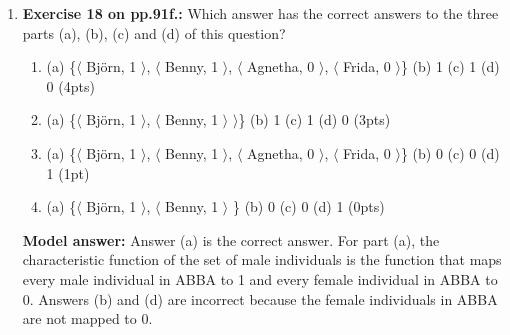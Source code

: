 \documentclass[a4,11pt]{article}
\begin{document}
\begin{enumerate}[leftmargin = 12pt]
\begin{enumerate}[noitemsep]
          \item (a) Agnetha (b) false (c) true (2pts)
        
         \item (a) Agnetha (b) true (c) true (1pt)
         
          \item (a) Agnetha (b) false (c) false (1pt)
         
\end{enumerate}

{\bf Model answer:} Answer (a) is the correct answer. For part (a), the `partner' function maps Agnetha to Bj\"orn, as represented by the pair $\langle$ Agnetha, Bj\"orn $\rangle$. 

For part (b), the `partner' function maps Bj\"orn to Agnetha, not to Frida, so the statement is false. 

For part (c), the `partner' function maps Bj\"orn to Agnetha, so $f(f($Bj\"orn$))$ is $f($Agnetha$)$, which is identical to the expression to the right of the equal sign.

\item {\bf Exercise 18 on pp.91f.:} Which answer has the correct answers to the three parts (a), (b), (c) and (d) of this question? 

\begin{enumerate}[noitemsep]
        \item (a) \{$\langle$ Bj\"orn, 1 $\rangle$, $\langle$ Benny, 1 $\rangle$, $\langle$ Agnetha, 0 $\rangle$, $\langle$ Frida, 0 $\rangle$\} (b) 1 (c)  1 (d) 0 (4pts)
        
     \item (a) \{$\langle$ Bj\"orn, 1 $\rangle$, $\langle$ Benny, 1 $\rangle$ $\rangle$\} (b) 1 (c)  1 (d) 0 (3pts)
     
      \item (a) \{$\langle$ Bj\"orn, 1 $\rangle$, $\langle$ Benny, 1 $\rangle$, $\langle$ Agnetha, 0 $\rangle$, $\langle$ Frida, 0 $\rangle$\} (b) 0  (c)  0 (d) 1  (1pt)
      
       \item (a) \{$\langle$ Bj\"orn, 1 $\rangle$, $\langle$ Benny, 1 $\rangle$ \} (b) 0 (c)  0 (d) 1 (0pts)
         
\end{enumerate}

{\bf Model answer:} Answer (a) is the correct answer. For part (a), the characteristic function of the set of male individuals is the function that maps every male individual in ABBA to 1 and every female individual in ABBA to 0. Answers (b) and (d) are incorrect because the female individuals in ABBA are not mapped to 0. 


\end{enumerate}
\end{document}
